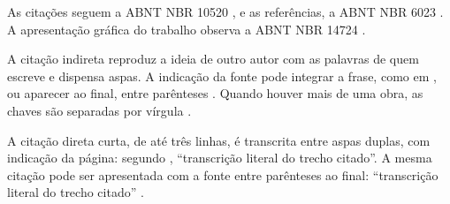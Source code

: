 As citações seguem a ABNT NBR 10520 \cite{abnt10520}, e as referências, a ABNT NBR 6023 \cite{abnt6023}. A apresentação gráfica do trabalho observa a ABNT NBR 14724 \cite{abnt14724}.

A citação indireta reproduz a ideia de outro autor com as palavras de quem escreve e dispensa aspas. A indicação da fonte pode integrar a frase, como em , ou aparecer ao final, entre parênteses \cite{lakatos2003}. Quando houver mais de uma obra, as chaves são separadas por vírgula \cite{gil2008,lakatos2003}.

A citação direta curta, de até três linhas, é transcrita entre aspas duplas, com indicação da página: segundo , \enquote{transcrição literal do trecho citado}. A mesma citação pode ser apresentada com a fonte entre parênteses ao final: \enquote{transcrição literal do trecho citado} \cite[p.~15]{modeloartigo}.

